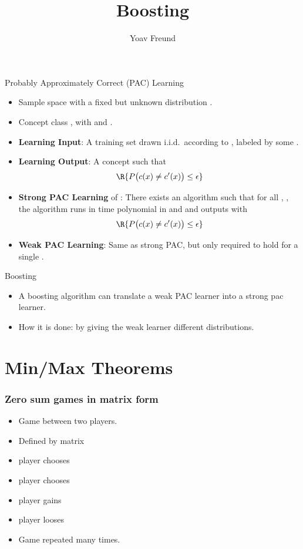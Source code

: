 \documentclass{beamer}
\title[\ouralg] %
{Boosting}
\author[Freund] %
{Yoav Freund}
\date{}
\institute[Universities of Somewhere and Elsewhere] %
\begin{document}
\begin{frame}
  \titlepage
  \begin{small}
  \end{small}
\end{frame}


\begin{frame}{Probably Approximately Correct (PAC) Learning}
  \begin{itemize}
    \item Sample space  with a fixed but unknown distribution .
    \item Concept class , with  and .
    \item \textbf{Learning Input}: A training set  
          drawn i.i.d.\ according to , labeled by some .
    \item \textbf{Learning Output}: A concept  such that 
      \[
         \R{P\bigl(c(x) \neq c'(x)\bigr) \leq \epsilon}
      \]
    \item \textbf{Strong PAC Learning} of : There exists an algorithm such that 
      for all \R{$\epsilon$}, \R{$\delta$}, the algorithm runs in time polynomial 
      in  and  and outputs  with
      \[
        \R{P\bigl(c(x) \neq c'(x)\bigr) \leq \epsilon}
      \]
    \item \textbf{Weak PAC Learning}: Same as strong PAC, 
      but only required to hold for a single .
  \end{itemize}
\end{frame}

\begin{frame}{Boosting}
  \begin{itemize}
  \item A boosting algorithm can translate a weak PAC learner into a strong pac learner.
  \item How it is done: by giving the weak learner different distributions.
  \end{itemize}
  \end{frame}

\section{Min/Max Theorems}

\begin{frame}
\frametitle{Zero sum games in matrix form}
\begin{itemize}
\item Game between two players.
\item Defined by  matrix \R{$\M$}
\item {} player chooses 
\item {} player chooses 
\item {} player gains 
\item {} player looses 
\item Game repeated many times.
\end{itemize}
\end{frame}
\end{document}
